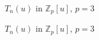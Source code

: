 \documentclass{beamer}
\begin{document}
\begin{frame}{$T_n(u)$ in $\mathbb{Z}_p[u]$, $p=3$}
 \vspace{-18pt}
\end{frame}

\begin{frame}{$T_n(u)$ in $\mathbb{Z}_p[u]$, $p=3$}
 \vspace{-18pt}
\end{frame}
\end{document}
